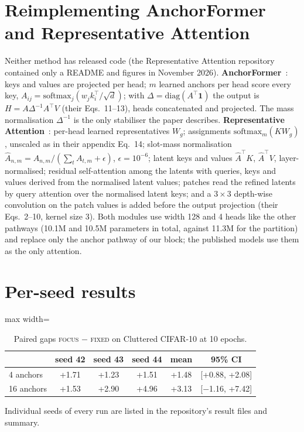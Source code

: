 \documentclass[runningheads]{llncs}
\newcommand{\focus}{\textsc{focus}}
\newcommand{\fixed}{\textsc{fixed}}
\begin{document}
\section{Reimplementing AnchorFormer and Representative Attention}
\label{app:reimpl}
Neither method has released code (the Representative Attention repository contained only a README
and figures in November 2026). \textbf{AnchorFormer}~\cite{anchorformer2025}: keys and values are
projected per head; $m$ learned anchors per head score every key, $A_{ij}=\mathrm{softmax}_j(w_j
k_i^{\top}/\sqrt{d})$; with $\Delta=\mathrm{diag}(A^{\top}\mathbf{1})$ the output is
$H=A\Delta^{-1}A^{\top}V$ (their Eqs.~11--13), heads concatenated and projected. The mass
normalisation $\Delta^{-1}$ is the only stabiliser the paper describes. \textbf{Representative
Attention}~\cite{representative2026}: per-head learned representatives $W_g$; assignments
$\mathrm{softmax}_m(KW_g)$, unscaled as in their appendix Eq.~14; slot-mass normalisation
$\hat A_{n,m}=A_{n,m}/(\sum_t A_{t,m}+\epsilon)$, $\epsilon=10^{-6}$; latent keys and values
$\hat A^{\top}K$, $\hat A^{\top}V$, layer-normalised; residual self-attention among the latents
with queries, keys and values derived from the normalised latent values; patches read the refined
latents by query attention over the normalised latent keys; and a $3\times3$ depth-wise
convolution on the patch values is added before the output projection (their Eqs.~2--10, kernel
size 3). Both modules use width 128 and 4 heads like the other pathways (10.1M and 10.5M
parameters in total, against 11.3M for the partition) and replace only the anchor pathway of our
block; the published models use them as the only attention.

\section{Per-seed results}
\label{app:perseed}
\begin{table}[h]
\centering
\caption{Paired gaps \focus{} $-$ \fixed{} on Cluttered CIFAR-10 at 10 epochs.}
\begin{adjustbox}{max width=\linewidth}
\begin{tabular}{lccccc}
\toprule
& seed 42 & seed 43 & seed 44 & mean & 95\% CI \\
\midrule
4 anchors & +1.71 & +1.23 & +1.51 & +1.48 & [+0.88, +2.08] \\
16 anchors & +1.53 & +2.90 & +4.96 & +3.13 & [$-$1.16, +7.42] \\
\bottomrule
\end{tabular}
\end{adjustbox}
\end{table}
Individual seeds of every run are listed in the repository's result files and summary.
\end{document}
